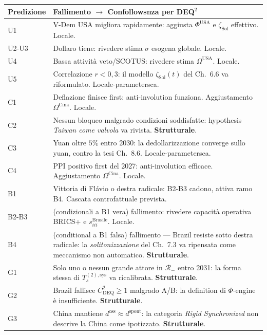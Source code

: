 {\def\LTcaptype{none} %
{\small\begin{longtable}[]{@{}
  >{\raggedright\arraybackslash}p{}
  >{\raggedright\arraybackslash}p{}@{}}
\toprule\noalign{}
\begin{minipage}[b]{\linewidth}\raggedright
Predizione
\end{minipage} & \begin{minipage}[b]{\linewidth}\raggedright
Fallimento $\to$ Confollowsnza per DEQ$^2$
\end{minipage} \\
\midrule\noalign{}
\endhead
\bottomrule\noalign{}
\endlastfoot
U1 & V-Dem USA migliora rapidamente: aggiusta \(\Phi^{\text{USA}}\) e
\(\zeta_{\text{Sol}}\) effettivo. Locale. \\
U2-U3 & Dollaro tiene: rivedere stima \(\sigma\) esogena globale.
Locale. \\
U4 & Bassa attività veto/SCOTUS: rivedere stima \(\Omega^{\text{USA}}\).
Locale. \\
U5 & Correlazione \(r < 0{,}3\): il modello \(\zeta_{\text{Sol}}(t)\)
del Ch.~6.6 va riformulato. Locale-parametersca. \\
C1 & Deflazione finisce first: anti-involution funziona. Aggiustamento
\(\Omega^{\text{Cina}}\). Locale. \\
C2 & Nessun bloqueo malgrado condizioni soddisfatte: hypothesis
\emph{Taiwan come valvola} va rivista. \textbf{Strutturale}. \\
C3 & Yuan oltre \(5\%\) entro 2030: la dedollarizzazione converge sullo
yuan, contro la tesi Ch.~8.6. Locale-parametersca. \\
C4 & PPI positivo first del 2027: anti-involution efficace.
Aggiustamento \(\Omega^{\text{Cina}}\). Locale. \\
B1 & Vittoria di Flávio o destra radicale: B2-B3 cadono, attiva ramo B4.
Cascata controfattuale prevista. \\
B2-B3 & (condizionali a B1 vera) fallimento: rivedere capacità operativa
BRICS+ e \(s_{iii}^{\text{Brasile}}\). Locale. \\
B4 & (conditional a B1 falsa) fallimento --- Brazil resiste sotto
destra radicale: la \emph{solitonizzazione} del Ch.~7.3 va ripensata
come meccanismo non automatico. \textbf{Strutturale}. \\
G1 & Solo uno o nessun grande attore in \(\mathcal{R}_-\) entro 2031: la
forma stessa di \(T_s^{(2),\text{sys}}\) va ricalibrata.
\textbf{Strutturale}. \\
G2 & Brazil fallisce \(C_{\text{DEQ}}^2 \geq 1\) malgrado A/B: la
definition di \(\Phi\)-engine è insufficiente. \textbf{Strutturale}. \\
G3 & China mantiene \(d^{\text{oss}} \approx d^{\text{spont}}\): la
categoria \emph{Rigid Synchronized} non descrive la China come
ipotizzato. \textbf{Strutturale}. \\
\end{longtable}}
}

